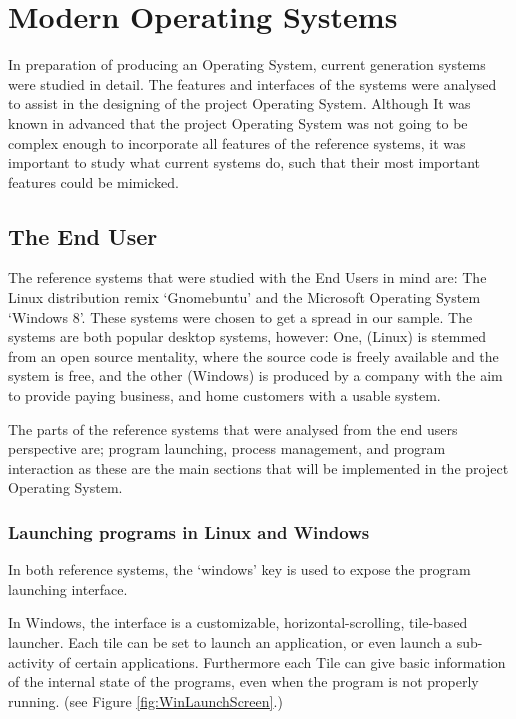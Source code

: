 \documentclass[a4paper]{report}
\begin{document}
\clearpage
\section*{Modern Operating Systems}

In preparation of producing an Operating System, current generation systems were studied in detail. The features and interfaces of the systems were analysed to assist in the designing of the project Operating System. Although It was known in advanced that the project Operating System was not going to be complex enough to incorporate all features of the reference systems, it was important to study what current systems do, such that their most important features could be mimicked.

\subsection*{The End User}
The reference systems that were studied with the End Users in mind are: The Linux distribution remix `Gnomebuntu' and the Microsoft Operating System `Windows 8'. These systems were chosen to get a spread in our sample. The systems are both popular desktop systems, however: One, (Linux) is stemmed from an open source mentality, where the source code is freely available and the system is free, and the other (Windows) is produced by a company with the aim to provide paying business, and home customers with a usable system.

The parts of the reference systems that were analysed from the end users perspective are; program launching, process management, and program interaction as these are the main sections that will be implemented in the project Operating System.

\subsubsection*{Launching programs in Linux and Windows}

In both reference systems, the `windows' key is used to expose the program launching interface.

In Windows, the interface is a customizable, horizontal-scrolling, tile-based launcher. Each tile can be set to launch an application, or even launch a sub-activity of certain applications. Furthermore each Tile can give basic information of the internal state of the programs, even when the program is not properly running. (see Figure \ref{fig:WinLaunchScreen}.)
\end{document}
